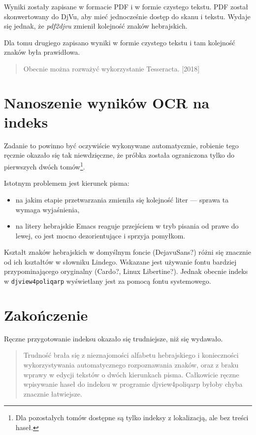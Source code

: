 \documentclass[12]{mwart}
\begin{document}
Wyniki zostały zapisane w formacie PDF i w formie czystego tekstu. PDF
został skonwertowany do DjVu, aby mieć jednocześnie dostęp do skanu i
tekstu. Wydaje się jednak, że \textit{pdf2djvu} zmienił kolejność
znaków hebrajskich.

Dla tomu drugiego zapisano wyniki w formie czystego tekstu i tam
kolejność znaków była prawidłowa.

\begin{quote}
  Obecnie można rozważyć wykorzystanie Tesseracta. [2018]
\end{quote}

\section{Nanoszenie wyników OCR na indeks}
\label{sec:nanosz-wynik-ocr}

Zadanie to powinno być oczywiście wykonywane automatycznie, robienie
tego ręcznie okazało się tak niewdzięczne, że próbka została
ograniczona tylko do pierwszych dwóch tomów\footnote{Dla pozostałych
  tomów dostępne są tylko indeksy z lokalizacją, ale bez treści
  haseł.}.

Istotnym problemem jest kierunek pisma:
\begin{itemize}
\item na jakim etapie przetwarzania zmieniła się kolejność liter ---
  sprawa ta wymaga wyjaśnienia,
\item na litery hebrajskie Emacs reaguje przejściem w tryb pisania od
  prawe do lewej, co jest mocno dezorientujące i sprzyja pomyłkom.
\end{itemize}

Kształt znaków hebrajskich w domyślnym foncie (DejavuSans?) różni się
znacznie od ich kształtów w słowniku Lindego. Wskazane jest używanie
fontu bardziej przypominającego oryginalny (Cardo?, Linux
Libertine?). Jednak obecnie indeks w \texttt{djview4poliqarp}
wyświetlany jest za pomocą fontu systemowego.

\section{Zakończenie}
\label{sec:zakoczenie}

Ręczne przygotowanie indeksu okazało się trudniejsze, niż się
wydawało.

\begin{quote}
  Trudność brała się z nieznajomości alfabetu hebrajskiego i
  konieczności wykorzystywania automatycznego rozpoznawania znaków,
  oraz z braku wprawy w edycji tekstów o dwóch kierunkach
  pisma. Całkowicie ręczne wpisywanie haseł do indeksu w programie
  \textsf{djview4poliqarp} byłoby chyba znacznie łatwiejsze.
\end{quote}
\end{document}

